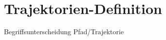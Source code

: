 
\section{Trajektorien-Definition}
Begriffsunterscheidung Pfad/Trajektorie







































